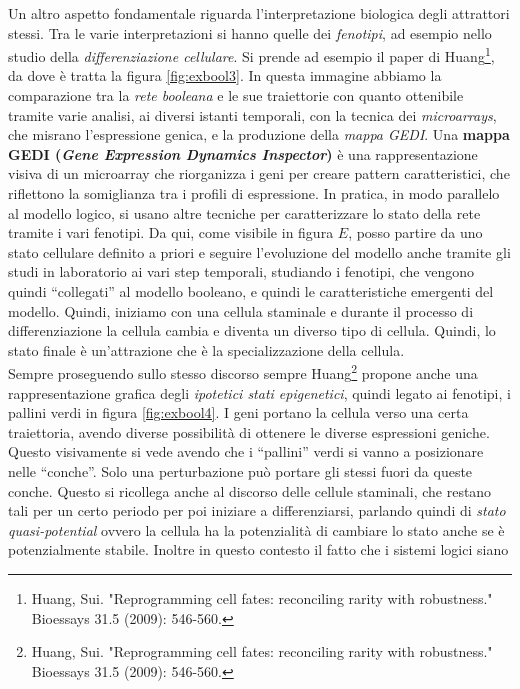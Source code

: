 \documentclass[a4paper,12pt, oneside]{book}
\begin{document}
Un altro aspetto fondamentale riguarda l'interpretazione biologica degli
attrattori stessi. Tra le varie interpretazioni si hanno quelle dei
\textit{fenotipi}, ad esempio nello studio della \textit{differenziazione
  cellulare}. Si prende ad esempio il paper di Huang\footnote{Huang,
  Sui. "Reprogramming cell fates: reconciling rarity with robustness." Bioessays
  31.5 (2009): 546-560.}, da dove è tratta la figura \ref{fig:exbool3}. In
questa immagine abbiamo la comparazione tra la \textit{rete booleana} e le sue
traiettorie con quanto ottenibile tramite varie analisi, ai diversi istanti
temporali, con la tecnica dei \textit{microarrays}, che misrano l'espressione
genica, e la produzione della
\textit{mappa GEDI}. Una \textbf{mappa GEDI (\textit{Gene Expression Dynamics
    Inspector})} è una 
rappresentazione visiva di un microarray che riorganizza i geni per creare
pattern caratteristici, che riflettono la somiglianza tra i profili di
espressione. In pratica, in modo parallelo al modello logico, si usano altre
tecniche per caratterizzare lo stato della rete tramite i vari fenotipi. Da qui,
come visibile in figura $E$, posso partire da uno stato cellulare definito a
priori e seguire l'evoluzione del modello anche tramite gli studi in laboratorio
ai vari step temporali, studiando i fenotipi, che vengono quindi ``collegati''
al modello booleano, e quindi le caratteristiche emergenti del modello. Quindi,
iniziamo con una cellula staminale e durante il processo di differenziazione la
cellula cambia e diventa un diverso tipo di cellula. Quindi, lo stato finale è
un'attrazione che è la specializzazione della cellula.  \\
Sempre proseguendo sullo stesso discorso sempre Huang\footnote{Huang,
  Sui. "Reprogramming cell fates: reconciling rarity with robustness." Bioessays
  31.5 (2009): 546-560.} propone anche una rappresentazione grafica degli
\textit{ipotetici stati epigenetici}, quindi legato ai fenotipi, i pallini verdi
in figura \ref{fig:exbool4}. I geni portano la cellula verso una certa
traiettoria, avendo diverse possibilità di ottenere le diverse espressioni
geniche. Questo visivamente si vede avendo che i ``pallini'' verdi si vanno a
posizionare nelle ``conche''. Solo una perturbazione può portare gli stessi
fuori da queste conche. Questo si ricollega anche al discorso delle cellule
staminali, che restano tali per un certo periodo per poi iniziare a
differenziarsi, parlando quindi di \textit{stato quasi-potential} ovvero la
cellula ha la potenzialità di cambiare lo stato anche se è potenzialmente
stabile. Inoltre in questo contesto il fatto che i sistemi logici siano
\end{document}
